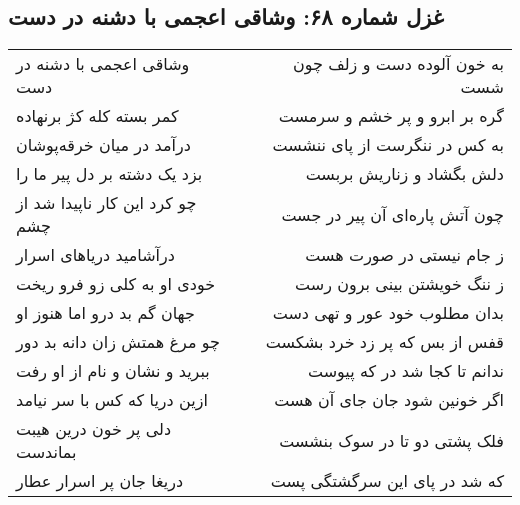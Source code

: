 \begin{center}
\section*{غزل شماره ۶۸: وشاقی اعجمی با دشنه در دست}
\label{sec:068}
\begin{longtable}{l p{0.5cm} r}
وشاقی اعجمی با دشنه در دست
&&
به خون آلوده دست و زلف چون شست
\\
کمر بسته کله کژ برنهاده
&&
گره بر ابرو و پر خشم و سرمست
\\
درآمد در میان خرقه‌پوشان
&&
به کس در ننگرست از پای ننشست
\\
بزد یک دشته بر دل پیر ما را
&&
دلش بگشاد و زناریش بربست
\\
چو کرد این کار ناپیدا شد از چشم
&&
چون آتش پاره‌ای آن پیر در جست
\\
درآشامید دریاهای اسرار
&&
ز جام نیستی در صورت هست
\\
خودی او به کلی زو فرو ریخت
&&
ز ننگ خویشتن بینی برون رست
\\
جهان گم بد درو اما هنوز او
&&
بدان مطلوب خود عور و تهی دست
\\
چو مرغ همتش زان دانه بد دور
&&
قفس از بس که پر زد خرد بشکست
\\
ببرید و نشان و نام از او رفت
&&
ندانم تا کجا شد در که پیوست
\\
ازین دریا که کس با سر نیامد
&&
اگر خونین شود جان جای آن هست
\\
دلی پر خون درین هیبت بماندست
&&
فلک پشتی دو تا در سوک بنشست
\\
دریغا جان پر اسرار عطار
&&
که شد در پای این سرگشتگی پست
\\
\end{longtable}
\end{center}
